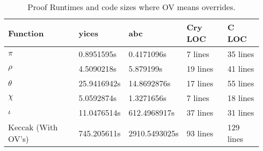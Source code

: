 \begin{table}[t]
  \caption{Proof Runtimes and code sizes where OV means overrides.}\label{statsTable}
  \label{table:stats}
  \setlength{\tabcolsep}{6.5pt}
  \begin{tabular}{|l|l|l|l|l|}
  \hline
  \textbf{Function} & \textbf{yices} & \textbf{abc} & \textbf{Cry LOC} & \textbf{C LOC} \\
  \hline
  $\pi$ & 	0.8951595s & 0.4171096s & 7 lines & 35 lines \\
  $\rho$ & 4.5090218s & 5.879199s & 19 lines & 41 lines \\
  $\theta$ & 25.9416942s & 14.8692876s & 17 lines & 55 lines \\
  $\chi$ & 5.0592874s & 1.3271656s & 7 lines & 18 lines \\
  $\iota$ & 11.0476514s & 612.4968917s & 37 lines & 31 lines \\
  Keccak (With OV's) & 745.205611s &	2910.5493025s & 93 lines & 129 lines \\
  \hline
  \end{tabular}
  \end{table}